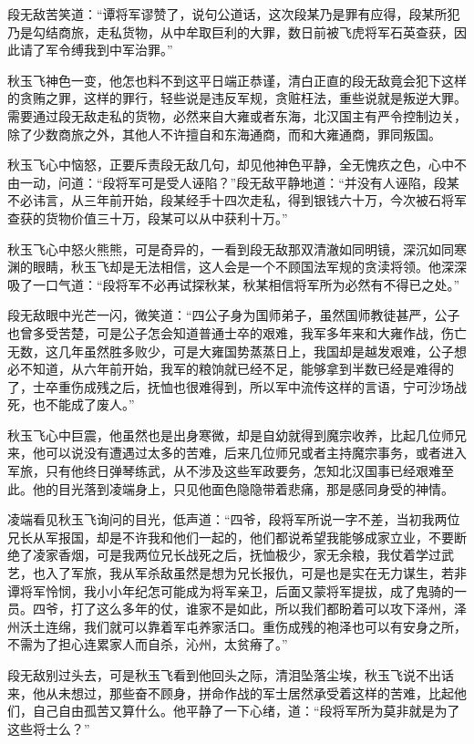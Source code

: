 段无敌苦笑道：“谭将军谬赞了，说句公道话，这次段某乃是罪有应得，段某所犯乃是勾结商旅，走私货物，从中牟取巨利的大罪，数日前被飞虎将军石英查获，因此请了军令缚我到中军治罪。”

秋玉飞神色一变，他怎也料不到这平日端正恭谨，清白正直的段无敌竟会犯下这样的贪贿之罪，这样的罪行，轻些说是违反军规，贪赃枉法，重些说就是叛逆大罪。需要通过段无敌走私的货物，必然来自大雍或者东海，北汉国主有严令控制边关，除了少数商旅之外，其他人不许擅自和东海通商，而和大雍通商，罪同叛国。

秋玉飞心中恼怒，正要斥责段无敌几句，却见他神色平静，全无愧疚之色，心中不由一动，问道：“段将军可是受人诬陷？”段无敌平静地道：“并没有人诬陷，段某不必讳言，从三年前开始，段某经手十四次走私，得到银钱六十万，今次被石将军查获的货物价值三十万，段某可以从中获利十万。”

秋玉飞心中怒火熊熊，可是奇异的，一看到段无敌那双清澈如同明镜，深沉如同寒渊的眼睛，秋玉飞却是无法相信，这人会是一个不顾国法军规的贪渎将领。他深深吸了一口气道：“段将军不必再试探秋某，秋某相信将军所为必然有不得已之处。”

段无敌眼中光芒一闪，微笑道：“四公子身为国师弟子，虽然国师教徒甚严，公子也曾多受苦楚，可是公子怎会知道普通士卒的艰难，我军多年来和大雍作战，伤亡无数，这几年虽然胜多败少，可是大雍国势蒸蒸日上，我国却是越发艰难，公子想必不知道，从六年前开始，我军的粮饷就已经不足，能够拿到半数已经是难得的了，士卒重伤成残之后，抚恤也很难得到，所以军中流传这样的言语，宁可沙场战死，也不能成了废人。”

秋玉飞心中巨震，他虽然也是出身寒微，却是自幼就得到魔宗收养，比起几位师兄来，他可以说没有遭遇过太多的苦难，后来几位师兄或者主持魔宗事务，或者进入军旅，只有他终日弹琴练武，从不涉及这些军政要务，怎知北汉国事已经艰难至此。他的目光落到凌端身上，只见他面色隐隐带着悲痛，那是感同身受的神情。

凌端看见秋玉飞询问的目光，低声道：“四爷，段将军所说一字不差，当初我两位兄长从军报国，却是不许我和他们一起的，他们都说希望我能够成家立业，不要断绝了凌家香烟，可是我两位兄长战死之后，抚恤极少，家无余粮，我仗着学过武艺，也入了军旅，我从军杀敌虽然是想为兄长报仇，可是也是实在无力谋生，若非谭将军怜悯，我小小年纪怎可能成为将军亲卫，后面又蒙将军提拔，成了鬼骑的一员。四爷，打了这么多年的仗，谁家不是如此，所以我们都盼着可以攻下泽州，泽州沃土连绵，我们就可以靠着军屯养家活口。重伤成残的袍泽也可以有安身之所，不需为了担心连累家人而自杀，沁州，太贫瘠了。”

段无敌别过头去，可是秋玉飞看到他回头之际，清泪坠落尘埃，秋玉飞说不出话来，他从未想过，那些奋不顾身，拼命作战的军士居然承受着这样的苦难，比起他们，自己自由孤苦又算什么。他平静了一下心绪，道：“段将军所为莫非就是为了这些将士么？”

